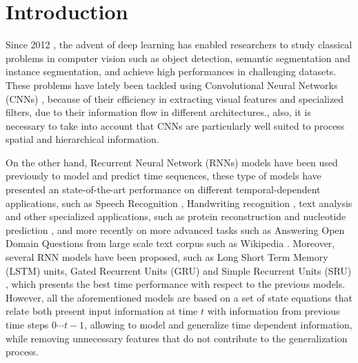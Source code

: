 \chapter{Introduction}
\label{introduction}
Since 2012 \cite{krizhevsky2012imagenet}, the advent of deep learning has enabled researchers to study classical problems in computer vision such as object detection, semantic segmentation and instance segmentation, and achieve high performances in challenging datasets. These problems have lately been tackled using Convolutional Neural Networks (CNNs) \cite{DBLP:journals/corr/LongSD14}\cite{zhao2017pspnet}\cite{he_mask_2017} \cite{DBLP:journals/corr/HeZRS15}\cite{DBLP:journals/corr/HuangLW16a}, because of their efficiency in extracting visual features and specialized filters, due to their information flow in different architectures., also, it is necessary to take into account that CNNs are particularly well suited to process spatial and hierarchical information. 

On the other hand, Recurrent Neural Network (RNNs) models have been used previously to model and predict time sequences, these type of models have presented an state-of-the-art performance on different temporal-dependent applications, such as Speech Recognition \cite{DBLP:journals/corr/abs-1303-5778}, Handwriting recognition \cite{DBLP:journals/corr/Graves13}, text analysis and other specialized applications, such as protein reconstruction and nucleotide prediction \cite{doi:10.1093/bioinformatics/btw678}, and more recently on more advanced tasks such as Answering Open Domain Questions from large scale text corpus such as Wikipedia \cite{chen2017reading}. Moreover, several RNN models have been proposed, such as Long Short Term Memory (LSTM) \cite{Hochreiter:1997:LSM:1246443.1246450} units, Gated Recurrent Units (GRU) \cite{DBLP:journals/corr/ChoMGBSB14} and Simple Recurrent Units (SRU) \cite{DBLP:journals/corr/abs-1709-02755}, which presents the best time performance with respect to the previous models. However, all the aforementioned models are based on a set of state equations that relate both present input information at time $t$ with information from previous time steps $0 \cdots t-1$, allowing to model and generalize time dependent information, while removing unnecessary features that do not contribute to the generalization process.


